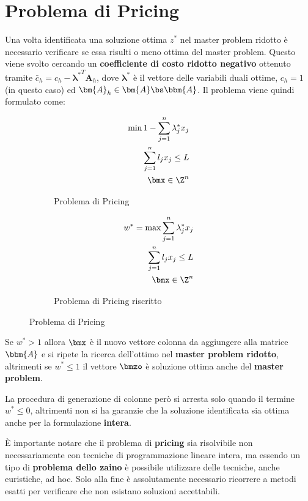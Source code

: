 \documentclass[\main/main.tex]{subfiles}
\begin{document}
\section{Problema di Pricing}
Una volta identificata una soluzione ottima \(z^*\) nel master problem ridotto è necessario verificare se essa risulti o meno ottima del master problem. Questo viene svolto cercando un \textbf{coefficiente di costo ridotto negativo} ottenuto tramite \(\bar{c}_h = c_h - {\bm{\lambda}^*}^T \bm{A}_h\), dove \(\bm{\lambda}^*\) è il vettore delle variabili duali ottime, \(c_h=1\) (in questo caso) ed \(\bm{A}_h \in \bm{A}\bs \bbm{A}\). Il problema viene quindi formulato come:

\begin{figure}
    \begin{subfigure}{0.49\textwidth}
        \begin{align*}
            \min 1 - \sum_{j=1}^n \lambda_j^* x_j\\
            \sum_{j=1}^n l_j x_j \leq L\\
            \bmx \in \Z^n
        \end{align*}
        \caption{Problema di Pricing}
    \end{subfigure}
    \begin{subfigure}{0.49\textwidth}
        \begin{align*}
            w^* = \max \sum_{j=1}^n \lambda_j^* x_j\\
            \sum_{j=1}^n l_j x_j \leq L\\
            \bmx \in \Z^n
        \end{align*}
        \caption{Problema di Pricing riscritto}
    \end{subfigure}
    \caption{Problema di Pricing}
\end{figure}

Se \(w^* > 1\) allora \(\bmx \) è il nuovo vettore colonna da aggiungere alla matrice \(\bbm{A}\) e si ripete la ricerca dell'ottimo nel \textbf{master problem ridotto}, altrimenti se \(w^* \leq 1\) il vettore \(\bmzo \) è soluzione ottima anche del \textbf{master problem}.

La procedura di generazione di colonne però si arresta solo quando il termine \(w^* \leq 0\), altrimenti non si ha garanzie che la soluzione identificata sia ottima anche per la formulazione \textbf{intera}.

È importante notare che il problema di \textbf{pricing} sia risolvibile non necessariamente con tecniche di programmazione lineare intera, ma essendo un tipo di \textbf{problema dello zaino} è possibile utilizzare delle tecniche, anche euristiche, ad hoc. Solo alla fine è assolutamente necessario ricorrere a metodi esatti per verificare che non esistano soluzioni accettabili.
\end{document}
